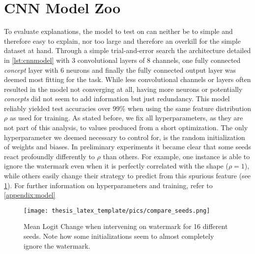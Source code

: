 \section{CNN Model Zoo}\label{section:training}
To evaluate explanations, the model to test on can neither be to simple and therefore easy to explain, nor too large and therefore an overkill for the simple dataset at hand.
Through a simple trial-and-error search the architecture detailed in \autoref{lst:cnnmodel} with 3 convolutional layers of 8 channels, one fully connected \textit{concept} layer with 6 neurons and finally the fully connected output layer was deemed most fitting for the task. While less convolutional channels or layers often resulted in the model not converging at all, having more neurons or potentially \textit{concepts} did not seem to add information but just redundancy.
This model reliably yielded test accuracies over 99\% when using the same feature distribution $\rho$ as used for training. As stated before, we fix all hyperparameters, as they are not part of this analysis, to values produced from a short optimization.
The only hyperparameter we deemed necessary to control for, is the random initialization of weights and biases. In preliminary experiments it became clear that some seeds react profoundly differently to $\rho$ than others. For example, one instance is able to ignore the watermark even when it is perfectly correlated with the shape ($\rho = 1$), while others easily change their strategy to predict from this spurious feature (see \cref{fig:gt_over_seeds}).  
For further information on hyperparameters and training, refer to \cref{appendix:model}

\begin{figure}
    \centering
    \texttt{[image: thesis\_latex\_template/pics/compare\_seeds.png]}
    \caption[Comparing Seeds]{Mean Logit Change when intervening on watermark for 16 different seeds. Note how some initializations seem to almost completely ignore the watermark.}
    \label{fig:gt_over_seeds}
\end{figure}

